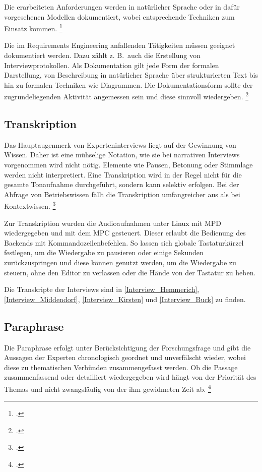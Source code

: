 Die erarbeiteten Anforderungen werden in natürlicher Sprache oder in dafür vorgesehenen Modellen dokumentiert, wobei entsprechende Techniken zum Einsatz kommen. \footcite[Vgl.][4]{Pohl_2015_Requirements}

Die im Requirements Engineering anfallenden Tätigkeiten müssen geeignet dokumentiert werden. Dazu zählt z. B.~auch die Erstellung von Interviewprotokollen. Als Dokumentation gilt jede Form der formalen Darstellung, von Beschreibung in natürlicher Sprache über strukturierten Text bis hin zu formalen Techniken wie Diagrammen. Die Dokumentationsform sollte der zugrundeliegenden Aktivität angemessen sein und diese sinnvoll wiedergeben. \footcite[Vgl.][35\psqq]{Pohl_2015_Requirements}


\subsection{Transkription}
Das Hauptaugenmerk von Experteninterviews liegt auf der Gewinnung von Wissen. Daher ist eine mühselige Notation, wie sie bei narrativen Interviews vorgenommen wird nicht nötig. Elemente wie Pausen, Betonung oder Stimmlage werden nicht interpretiert.
Eine Transkription wird in der Regel nicht für die gesamte Tonaufnahme durchgeführt, sondern kann selektiv erfolgen. Bei der Abfrage von Betriebswissen fällt die Transkription umfangreicher aus als bei Kontextwissen. \footcite[Vgl.][455\psq]{Meuser_1991_Interview}

Zur Transkription wurden die Audioaufnahmen unter Linux mit \acf{MPD} wiedergegeben und mit dem \acf{MPC} gesteuert. Dieser erlaubt die Bedienung des Backends mit Kommandozeilenbefehlen. So lassen sich globale Tastaturkürzel festlegen, um die Wiedergabe zu pausieren oder einige Sekunden zurückzuspringen und diese können genutzt werden, um die Wiedergabe zu steuern, ohne den Editor zu verlassen oder die Hände von der Tastatur zu heben.

Die Transkripte der Interviews sind in \autoref{Interview_Hemmerich}, \autoref{Interview_Middendorf}, \autoref{Interview_Kirsten} und \autoref{Interview_Buck} zu finden.


\subsection{Paraphrase}
Die Paraphrase erfolgt unter Berücksichtigung der Forschungsfrage und gibt die Aussagen der Experten chronologisch geordnet und unverfälscht wieder, wobei diese zu thematischen Verbünden zusammengefasst werden. Ob die Passage zusammenfassend oder detailliert wiedergegeben wird hängt von der Priorität des Themas und nicht zwangsläufig von der ihm gewidmeten Zeit ab.
\footcite[Vgl.][456\psq]{Meuser_1991_Interview}

